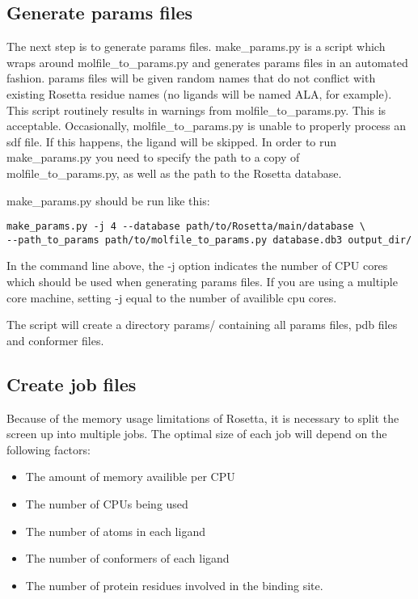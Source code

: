 \subsection{Generate params files}

The next step is to generate params files. make\_params.py is a script which wraps around molfile\_to\_params.py and generates params files in an automated fashion.
params files will be given random names that do not conflict with existing Rosetta residue names (no ligands will be named ALA, for example).
This script routinely results in warnings from molfile\_to\_params.py. 
This is acceptable.
Occasionally, molfile\_to\_params.py is unable to properly process an sdf file.
If this happens, the ligand will be skipped. In order to run make\_params.py you need to specify the path to a copy of molfile\_to\_params.py, as well as the path to the Rosetta database.

make\_params.py should be run like this:

\begin{verbatim}
make_params.py -j 4 --database path/to/Rosetta/main/database \
--path_to_params path/to/molfile_to_params.py database.db3 output_dir/
\end{verbatim}

In the command line above, the -j option indicates the number of CPU cores which should be used when generating params files.
If you are using a multiple core machine, setting -j equal to the number of availible cpu cores.

The script will create a directory params/ containing all params files, pdb files and conformer files.

\subsection{Create job files}

Because of the memory usage limitations of Rosetta, it is necessary to split the screen up into multiple jobs. 
The optimal size of each job will depend on the following factors:

\begin{itemize}
\itemsep1pt\parskip0pt
\item The amount of memory availible per CPU
\item The number of CPUs being used
\item The number of atoms in each ligand
\item The number of conformers of each ligand
\item The number of protein residues involved in the binding site.
\end{itemize}

